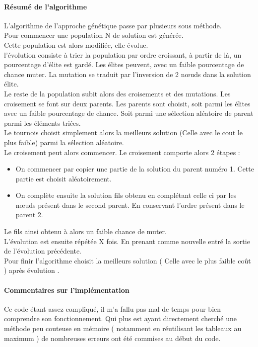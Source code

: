 \documentclass[10pt,a4paper]{report}
\begin{document}
		\paragraph{Résumé de l'algorithme\\}
		\begin{flushleft}
		L'algorithme de l'approche génétique passe par plusieurs sous méthode. \\
		Pour commencer une population N de solution est générée. \\
		Cette population est alors modifiée, elle évolue. \\
		l'évolution consiste à trier la population par ordre croissant, à partir de là, un pourcentage d'élite est gardé. Les élites peuvent, avec un faible pourcentage de chance muter. La mutation se traduit par l'inversion de 2 nœuds dans la solution élite. \\
		Le reste de la population subit alors des croisements et des mutations. Les croisement se font sur deux parents. Les parents sont choisit, soit parmi les élites avec un faible pourcentage de chance. Soit parmi une sélection aléatoire de parent parmi les éléments triées. \\
		Le tournois choisit simplement alors la meilleurs solution (Celle avec le cout le plus faible) parmi la sélection aléatoire. \\
		
		Le croisement peut alors commencer. Le croisement comporte alors 2 étapes :
		\begin{itemize}
			\item On commencer par copier une partie de la solution du parent numéro 1. Cette partie est choisit aléatoirement.
			\item On complète ensuite la solution fils obtenu en complétant celle ci par les nœuds présent dans le second parent. En conservant l'ordre présent dans le parent 2.
		\end{itemize}
		Le fils ainsi obtenu à alors un faible chance de muter. \\
		
		L'évolution est ensuite répétée X fois. En prenant comme nouvelle entré la sortie de l'évolution précédente. \\
		Pour finir l'algorithme choisit la meilleurs solution ( Celle avec le plus faible coût ) après évolution . \\
		\end{flushleft}
		
		\paragraph{Commentaires sur l'implémentation\\}
		Ce code étant assez compliqué, il m'a fallu pas mal de temps pour bien comprendre son fonctionnement. Qui plus est ayant directement cherché une méthode peu couteuse en mémoire ( notamment en réutilisant les tableaux au maximum ) de nombreuses erreurs ont été commises au début du code.
		
\end{document}
